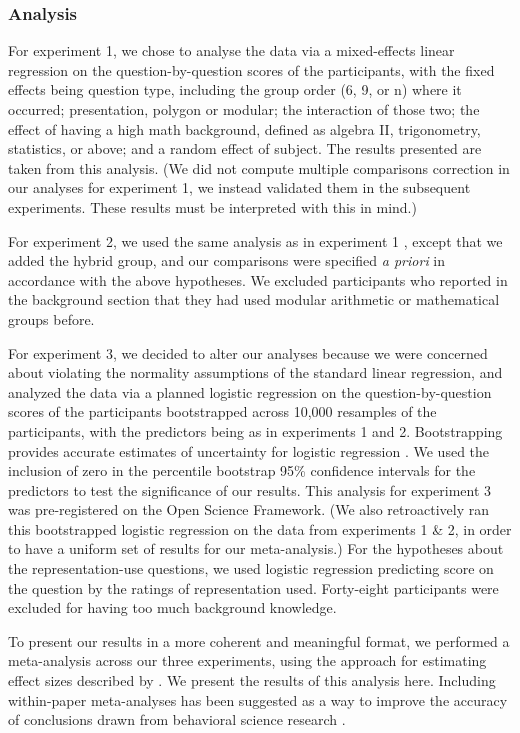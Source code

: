 \documentclass[man,10pt]{apa6}
\begin{document}
\subsubsection{Analysis}
For experiment 1, we chose to analyse the data via a mixed-effects linear regression on the question-by-question scores of the participants, with the fixed effects being question type, including the group order (6, 9, or n) where it occurred; presentation, polygon or modular; the interaction of those two; the effect of having a high math background, defined as algebra II, trigonometry, statistics, or above; and a random effect of subject. The results presented are taken from this analysis. (We did not compute multiple comparisons correction in our analyses for experiment 1, we instead validated them in the subsequent experiments. These results must be interpreted with this in mind.) \par 
For experiment 2, we used the same analysis as in experiment 1 , except that we added the hybrid group, and our comparisons were specified \textit{a priori} in accordance with the above hypotheses. We excluded  participants who reported in the background section that they had used modular arithmetic or mathematical groups before. \par
For experiment 3, we decided to alter our analyses because we were concerned about violating the normality assumptions of the standard linear regression, and analyzed the data via a planned logistic regression on the question-by-question scores of the participants bootstrapped across 10,000 resamples of the participants, with the predictors being as in experiments 1 and 2. Bootstrapping provides accurate estimates of uncertainty for logistic regression \cite{Wasserman2006,Gong1986}. We used the inclusion of zero in the percentile bootstrap 95\% confidence intervals for the predictors to test the significance of our results. This analysis for experiment 3 was pre-registered on the Open Science Framework.
(We also retroactively ran this bootstrapped logistic regression on the data from experiments 1 \& 2, in order to have a uniform set of results for our meta-analysis.) For the hypotheses about the representation-use questions, we used logistic regression predicting score on the question by the ratings of representation used. Forty-eight participants were excluded for having too much background knowledge.\par
To present our results in a more coherent and meaningful format, we performed a meta-analysis across our three experiments, using the approach for estimating effect sizes described by . We present the results of this analysis here. Including within-paper meta-analyses has been suggested as a way to improve the accuracy of conclusions drawn from behavioral science research \cite{Mcshane2017}.
\end{document}

